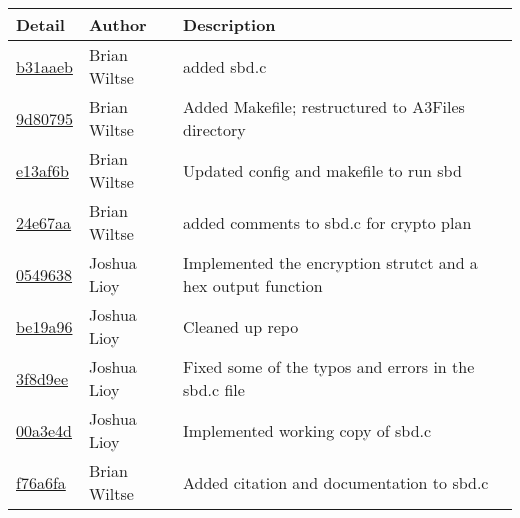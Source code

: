 \begin{tabular}{l l l}\textbf{Detail} & \textbf{Author} & \textbf{Description}\\\hline
\href{https://github.com/jlioy/group11repo/commit/b31aaeb07a47d3b5ea72cb5d825943f75b1ab8eb}{b31aaeb} & Brian Wiltse & added sbd.c\\\hline
\href{https://github.com/jlioy/group11repo/commit/9d807950a5f68e4084098a646810976f57e54837}{9d80795} & Brian Wiltse & Added Makefile; restructured to A3Files directory\\\hline
\href{https://github.com/jlioy/group11repo/commit/e13af6b369f5f33ba2795b20ec86231df6d974f0}{e13af6b} & Brian Wiltse & Updated config and makefile to run sbd\\\hline
\href{https://github.com/jlioy/group11repo/commit/24e67aa3de3256d9777b8e02b4b33dd6bd030bde}{24e67aa} & Brian Wiltse & added comments to sbd.c for crypto plan\\\hline
\href{https://github.com/jlioy/group11repo/commit/0549638dc4bff30485fb7da4c555967adcd0f9bd}{0549638} & Joshua Lioy & Implemented the encryption strutct and a hex output function\\\hline
\href{https://github.com/jlioy/group11repo/commit/be19a9632d4eb803d87c507fe5638d0093d92aff}{be19a96} & Joshua Lioy & Cleaned up repo\\\hline
\href{https://github.com/jlioy/group11repo/commit/3f8d9eefd44fb499a8e4a534a103aa784e8f4194}{3f8d9ee} & Joshua Lioy & Fixed some of the typos and errors in the sbd.c file\\\hline
\href{https://github.com/jlioy/group11repo/commit/00a3e4d5e28c79ee12e3cdc56dfcebab87baaa60}{00a3e4d} & Joshua Lioy & Implemented working copy of sbd.c\\\hline
\href{https://github.com/jlioy/group11repo/commit/f76a6fa97147396487c6e525b840ce67184ff1ad}{f76a6fa} & Brian Wiltse & Added citation and documentation to sbd.c\\\hline\end{tabular}
